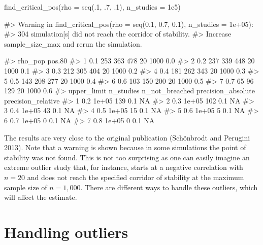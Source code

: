 \begin{Schunk}
\begin{Sinput}
find_critical_pos(rho = seq(.1, .7, .1), n_studies = 1e5)
\end{Sinput}
\begin{Soutput}
#> Warning in find_critical_pos(rho = seq(0.1, 0.7, 0.1), n_studies = 1e+05): 
#> 304 simulation[s] did not reach the corridor of stability.
#> Increase sample_size_max and rerun the simulation.
\end{Soutput}
\begin{Soutput}
#>   rho_pop pos.80% pos.90% pos.95% sample_size_min sample_size_max lower_limit
#> 1     0.1     253     363     478              20            1000         0.0
#> 2     0.2     237     339     448              20            1000         0.1
#> 3     0.3     212     305     404              20            1000         0.2
#> 4     0.4     181     262     343              20            1000         0.3
#> 5     0.5     143     208     277              20            1000         0.4
#> 6     0.6     103     150     200              20            1000         0.5
#> 7     0.7      65      96     129              20            1000         0.6
#>   upper_limit n_studies n_not_breached precision_absolute precision_relative
#> 1         0.2     1e+05            139                0.1                 NA
#> 2         0.3     1e+05            102                0.1                 NA
#> 3         0.4     1e+05             43                0.1                 NA
#> 4         0.5     1e+05             15                0.1                 NA
#> 5         0.6     1e+05              5                0.1                 NA
#> 6         0.7     1e+05              0                0.1                 NA
#> 7         0.8     1e+05              0                0.1                 NA
\end{Soutput}
\end{Schunk}

The results are very close to the original publication (Schönbrodt and Perugini 2013). Note that a warning is shown because in some simulations the point of stability was not found. This is not too surprising as one can easily imagine an extreme outlier study that, for instance, starts at a negative correlation with \(n=20\) and does not reach the specified corridor of stability at the maximum sample size of \(n=1,000\). There are different ways to handle these outliers, which will affect the estimate.

\hypertarget{handling-outliers}{%
\section{Handling outliers}\label{handling-outliers}}

